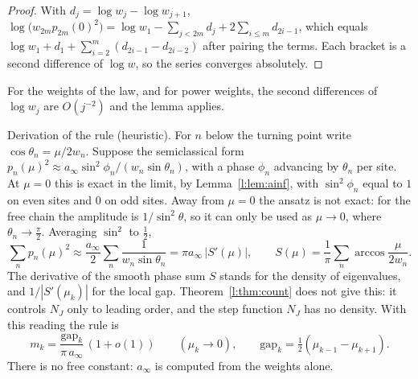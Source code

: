 \begin{proof}
With $d_j=\log w_j-\log w_{j+1}$, $\log\bigl(w_{2m}p_{2m}(0)^2\bigr)=\log w_1-\sum_{j<2m}d_j+2\sum_{i\le m}d_{2i-1}$, which equals $\log w_1+d_1+\sum_{i=2}^{m}(d_{2i-1}-d_{2i-2})$ after pairing the terms. Each bracket is a second difference of $\log w$, so the series converges absolutely.
\end{proof}

For the weights of the law, and for power weights, the second differences of $\log w_j$ are $O(j^{-2})$ and the lemma applies.

\medskip
\noindent Derivation of the rule (heuristic). For $n$ below the turning point write $\cos\theta_n=\mu/2w_n$. Suppose the semiclassical form $p_n(\mu)^2\approx a_\infty\sin^2\phi_n/(w_n\sin\theta_n)$, with a phase $\phi_n$ advancing by $\theta_n$ per site. At $\mu=0$ this is exact in the limit, by Lemma~\ref{l:lem:ainf}, with $\sin^2\phi_n$ equal to $1$ on even sites and $0$ on odd sites. Away from $\mu=0$ the ansatz is not exact: for the free chain the amplitude is $1/\sin^2\theta$, so it can only be used as $\mu\to0$, where $\theta_n\to\frac\pi2$. Averaging $\sin^2$ to $\frac12$,
\[
\sum_np_n(\mu)^2\approx\frac{a_\infty}{2}\sum_n\frac{1}{w_n\sin\theta_n}=\pi a_\infty\,\bigl|S'(\mu)\bigr|,\qquad S(\mu)=\frac1\pi\sum_n\arccos\frac\mu{2w_n}.
\]
The derivative of the smooth phase sum $S$ stands for the density of eigenvalues, and $1/|S'(\mu_k)|$ for the local gap. Theorem~\ref{l:thm:count} does not give this: it controls $N_J$ only to leading order, and the step function $N_J$ has no density. With this reading the rule is
\begin{equation}\label{l:eq:massrule}
m_k=\frac{\mathrm{gap}_k}{\pi\,a_\infty}\,(1+o(1))\qquad(\mu_k\to0),\qquad \mathrm{gap}_k=\tfrac12(\mu_{k-1}-\mu_{k+1}).
\end{equation}
There is no free constant: $a_\infty$ is computed from the weights alone.

